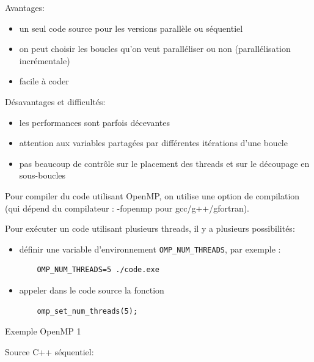 \documentclass{beamer}
\begin{document}
\begin{frame}

Avantages:
\begin{itemize}
	\item un seul code source pour les versions parallèle ou séquentiel
	\item on peut choisir les boucles qu'on veut paralléliser ou non (parallélisation incrémentale)
	\item facile à coder
\end{itemize}
\vfill

Désavantages et difficultés:
\begin{itemize}
	\item les performances sont parfois décevantes
	\item attention aux variables partagées par différentes itérations d'une boucle
	\item pas beaucoup de contrôle sur le placement des threads et sur le découpage en sous-boucles
\end{itemize}

\end{frame}

\begin{frame}[fragile]

Pour compiler du code utilisant OpenMP, on utilise une option de compilation (qui dépend du compilateur : -fopenmp pour gcc/g++/gfortran).

\vfill
Pour exécuter un code utilisant plusieurs threads, il y a plusieurs possibilités:
\begin{itemize}
	\item définir une variable d'environnement \verb|OMP_NUM_THREADS|, par exemple :
	\begin{lstlisting}
	OMP_NUM_THREADS=5 ./code.exe
	\end{lstlisting}
	\item appeler dans le code source la fonction 
	\begin{lstlisting}
	omp_set_num_threads(5);
	\end{lstlisting}
\end{itemize}
\vfill
\end{frame}

\begin{frame}
	Exemple OpenMP 1
\end{frame}


\begin{frame}[fragile]
	Source C++ séquentiel:
{
	\normalsize
		
}	
\end{frame}
\end{document}
